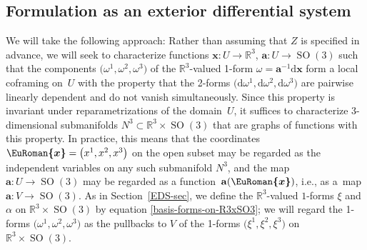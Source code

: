 \documentclass[pdftex]{sigma}
\numberwithin{equation}{section}
\newcommand{\eurom}{\EuRoman}
\renewcommand{\d}{\mathrm{d}}%
\newcommand{\bbR}{{\mathbb R}}
\newcommand{\SO}{\operatorname{SO}}
\newcommand{\mba}{\mathbf{a}}
\newcommand{\mbx}{\mathbf{x}}
\newcommand{\eurox}{\bm{\eurom{x}}}
\begin{document}
\subsection{Formulation as an exterior differential system}
We will take the following approach: Rather than assuming that $Z$ is specified in advance, we will seek to characterize functions $\mbx\colon U \to \bbR^3$, $\mba\colon U \to \SO(3)$ such that the components $\big(\omega^1, \omega^2, \omega^3\big)$ of the $\bbR^3$-valued 1-form $\omega = \mba^{-1} \d\mbx$ form a local coframing on~$U$ with the property that the 2-forms $\big(\d\omega^1, \d \omega^2, \d\omega^3\big)$ are pairwise linearly dependent and do not vanish simultaneously. Since this property is invariant under reparametrizations of the domain~$U$, it suffices to characterize 3-dimensional submanifolds $N^3 \subset \bbR^3 \times \SO(3)$ that are graphs of functions with this property. In practice, this means that the coordinates $\eurox = \big(x^1, x^2, x^3\big)$ on the open subset \smash{$V = \mbx(U) \subset \bbR^3$} may be regarded as the independent variables on any such submanifold $N^3$, and the map $\mba\colon U \to \SO(3)$ may be regarded as a function~$\mba(\eurox)$, i.e., as a~map $\mba\colon V \to \SO(3)$.
As in Section~\ref{EDS-sec}, we define the $\mathbb{R}^3$-valued $1$-forms $\xi$ and $\alpha$ on $\bbR^3 \times \SO(3)$ by equation \eqref{basis-forms-on-R3xSO3}; we will regard the 1-forms $\big(\omega^1, \omega^2, \omega^3\big)$ as the pullbacks to $V$ of the 1-forms $\big(\xi^1, \xi^2, \xi^3\big)$ on $\bbR^3 \times \SO(3)$.
\end{document}
